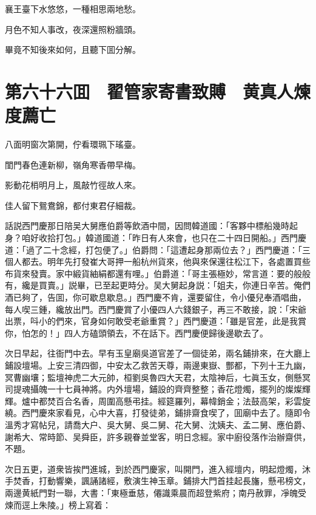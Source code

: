襄王臺下水悠悠，一種相思兩地愁。

月色不知人事改，夜深還照粉牆頭。

畢竟不知後來如何，且聽下囬分解。

\chapter*{第六十六囬　翟管家寄書致賻　黄真人煉度薦亡}

八面明窗次第開，佇看環珮下瑤臺。

閨門春色連新柳，嶺角寒香帶早梅。

影動花梢明月上，風敲竹徑故人來。

佳人留下鴛鴦錦，都付東君仔細裁。

話説西門慶那日陪吴大舅應伯爵等飲酒中間，因問韓道國：「客夥中標船幾時起身？咱好收拾打包。」韓道國道：「昨日有人來會，也只在二十四日開船。」西門慶道：「過了二十念經，打包便了。」伯爵問：「這遭起身那兩位去？」西門慶道：「三個人都去。明年先打發崔大哥押一船杭州貨來，他與來保還往松江下，各處置買些布貨來發賣。家中緞貨紬絹都還有哩。」伯爵道：「哥主張極妙，常言道：要的般般有，纔是買賣。」説畢，已至起更時分。吴大舅起身説：「姐夫，你連日辛苦。俺們酒已夠了，告囬，你可歇息歇息。」西門慶不肯，還要留住，令小優兒奉酒唱曲，每人喫三鍾，纔放出門。西門慶賞了小優四人六錢銀子，再三不敢接，說：「宋爺出票，呌小的們來，官身如何敢受老爺重賞？」西門慶道：「雖是官差，此是我賞你，怕怎的！」四人方磕頭領去，不在話下。西門慶便歸後邊歇去了。

次日早起，往衙門中去。早有玉皇廟吳道官差了一個徒弟，兩名鋪排來，在大廳上鋪設壇場。上安三清四御，中安太乙救苦天尊，兩邊東嶽、酆都，下列十王九幽，冥曹幽壤；監壇神虎二大元帥，桓劉吳魯四大天君，太陰神后，七眞玉女，側懸冥司提魂攝魄一十七員神將。内外壇場，鋪設的齊齊整整；香花燈燭，擺列的燦燦輝輝。爐中都焚百合名香，周圍高懸弔挂。經筵羅列，幕幃銷金；法鼓高架，彩雲旋繞。西門慶來家看見，心中大喜，打發徒弟，鋪排齋食喫了，囬廟中去了。隨即令溫秀才寫帖兒，請喬大户、吳大舅、吳二舅、花大舅、沈姨夫、孟二舅、應伯爵、謝希大、常時節、吴舜臣，許多親眷並堂客，明日念經。家中廚役落作治辦齋供，不題。

次日五更，道衆皆挨門進城，到於西門慶家，叫開門，進入經壇内，明起燈燭，沐手焚香，打動響樂，諷誦諸經，敷演生神玉章。鋪排大門首挂起長旛，懸弔榜文，兩邊黄紙門對一聯，大書：「東極垂慈，僊識乘晨而超登紫府；南丹赦罪，凈魄受煉而逕上朱陵。」榜上寫着：

